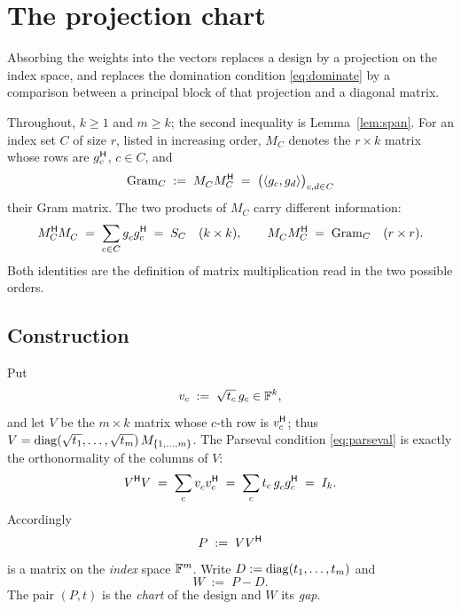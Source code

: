 \section{The projection chart}\label{sec:chart}

Absorbing the weights into the vectors replaces a design by a projection
on the index space, and replaces the domination condition
\eqref{eq:dominate} by a comparison between a principal block of that
projection and a diagonal matrix.

Throughout, $k\ge1$ and $m\ge k$; the second inequality is
Lemma~\ref{lem:span}.  For an index set $C$ of size $r$,
listed in increasing order, $M_C$ denotes the $r\times k$ matrix whose
rows are $g_c^{\mathsf{H}}$, $c\in C$, and
\[
  \Gram_C\;:=\;M_C^{\vphantom{\mathsf{H}}}M_C\adj
  \;=\;\bigl(\langle g_c,g_d\rangle\bigr)_{c,d\in C}
\]
their Gram matrix.  The two products of $M_C$ carry different
information:
\begin{equation}\label{eq:twoproducts}
  M_C\adj M_C^{\vphantom{\mathsf{H}}}\;=\;\sum_{c\in C}g_c^{\vphantom{\mathsf{H}}}g_c\adj
  \;=\;\SC \quad (k\times k),
  \qquad
  M_C^{\vphantom{\mathsf{H}}}M_C\adj\;=\;\Gram_C \quad (r\times r).
\end{equation}
Both identities are the definition of matrix multiplication read in the
two possible orders.

\subsection{Construction}\label{sec:chartconstruction}

Put
\[
  v_c\;:=\;\sqrt{t_c}\,g_c\in\mathbb{F}^{k},
\]
and let $V$ be the $m\times k$ matrix whose $c$-th row is $v_c^{\mathsf{H}}$; thus
$V=\operatorname{diag}(\sqrt{t_1},\dots,\sqrt{t_m})\,M_{\{1,\dots,m\}}$.  The Parseval
condition \eqref{eq:parseval} is exactly the orthonormality of the
columns of $V$:
\begin{equation}\label{eq:isometry}
  V\adj V\;=\;\sum_{c}v_c^{\vphantom{\mathsf{H}}}v_c\adj
  \;=\;\sum_c t_c\,g_c^{\vphantom{\mathsf{H}}}g_c\adj\;=\;I_k .
\end{equation}
Accordingly
\begin{equation}\label{eq:chart}
  P\;:=\;VV^{\mathsf{H}}
\end{equation}
is a matrix on the \emph{index} space $\mathbb{F}^m$.  Write
$D:=\operatorname{diag}(t_1,\dots,t_m)$ and
\begin{equation}\label{eq:chartgap}
  W\;:=\;P-D .
\end{equation}
The pair $(P,t)$ is the \emph{chart} of the design and $W$ its
\emph{gap}.

